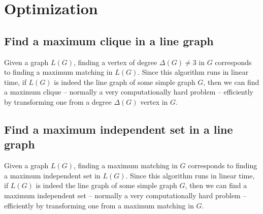 \documentclass[11pt]{article}
\begin{document}
\section{Optimization}
\subsection{Find a maximum clique in a line graph}
Given a graph $L(G)$, finding a vertex of degree $\Delta(G)\neq3$ in $G$
corresponds to finding a maximum matching in $L(G)$. Since this algorithm runs
in linear time, if $L(G)$ is indeed the line graph of some simple graph $G$,
then we can find a maximum clique -- normally a very computationally hard
problem -- efficiently by transforming one from a degree $\Delta(G)$ vertex in
$G$.


\subsection{Find a maximum independent set in a line graph}
Given a graph $L(G)$, finding a maximum matching in $G$ corresponds to finding
a maximum independent set in $L(G)$. Since this algorithm runs in linear time,
if $L(G)$ is indeed the line graph of some simple graph $G$, then we can find
a maximum independent set -- normally a very computationally hard problem --
efficiently by transforming one from a maximum matching in $G$.




\end{document}
